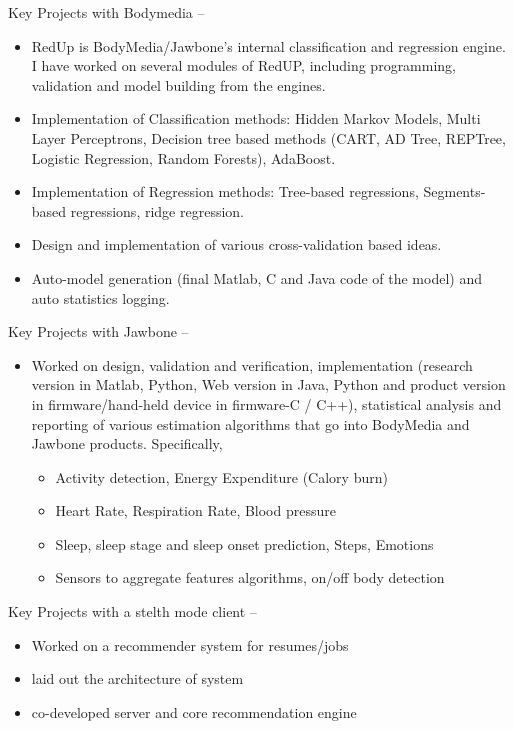 \documentclass[letterpaper,MMMyyyy,nonstop]{simpleresumecv}
\begin{document}
\begin{body}
\GapNoBreak
\BulletItem
Key Projects with Bodymedia
\hfill
{} --
\begin{detail}
  \begin{itemize}
      \item RedUp is BodyMedia/Jawbone’s internal classification and regression engine.
I have worked on several modules of RedUP, including programming, validation
and model building from the engines.
      \item Implementation of Classification methods: Hidden Markov Models, Multi Layer
Perceptrons, Decision tree based methods (CART, AD Tree, REPTree, Logistic
Regression, Random Forests), AdaBoost.
      \item Implementation of Regression methods: Tree-based regressions, Segments-based
regressions, ridge regression.
      \item Design and implementation of various cross-validation based ideas.
      \item Auto-model generation (final Matlab, C and Java code of the model) and auto statistics
logging.
\end{itemize}
\end{detail}

\GapNoBreak
\BulletItem
Key Projects with Jawbone
\hfill
{} --
\begin{detail}
\begin{itemize}
\item Worked on design, validation and verification, implementation (research version in Matlab,
Python, Web version in Java, Python and product version in firmware/hand-held device in
firmware-C / C++), statistical analysis and reporting of various estimation algorithms that go
into BodyMedia and Jawbone products. Specifically,
\begin{itemize}
   \item Activity detection, Energy Expenditure (Calory burn)
   \item Heart Rate, Respiration Rate, Blood pressure
   \item Sleep, sleep stage and sleep onset prediction, Steps, Emotions
   \item Sensors to aggregate features algorithms, on/off body detection
\end{itemize}

\end{itemize}

\GapNoBreak
\BulletItem
Key Projects with a stelth mode client
\hfill
{} --
\begin{detail}
\begin{itemize}
\item Worked on a recommender system for resumes/jobs
\item laid out the architecture of system
\item co-developed server and core recommendation engine
\end{itemize}


\end{detail}
\end{detail}
\end{body}
\end{document}
